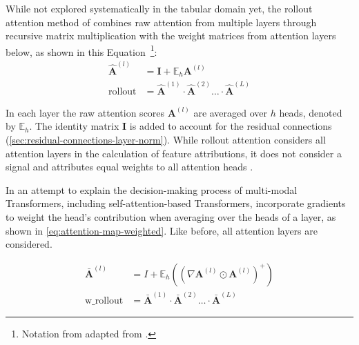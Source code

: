 While not explored systematically in the tabular domain yet, the rollout attention method of \textcite[][3]{abnarQuantifyingAttentionFlow2020} combines raw attention from multiple layers through recursive matrix multiplication with the weight matrices from attention layers below, as shown in this Equation~\footnote{Notation from adapted from \textcite[][786]{cheferTransformerInterpretabilityAttention2021}.}:
\begin{equation}
    \begin{aligned}
        \hat{\boldsymbol{A}}^{(l)} & =\boldsymbol{I}+\mathbb{E}_h \boldsymbol{A}^{(l)}                                                  \\
        \operatorname { rollout }  & =\hat{\boldsymbol{A}}^{(1)} \cdot \hat{\boldsymbol{A}}^{(2)} \ldots\cdot\hat{\boldsymbol{A}}^{(L)}
    \end{aligned}
    \label{eq:attention-map-rollout}
\end{equation}

In each layer the raw attention scores $\boldsymbol{A}^{(l)}$ are averaged over $h$ heads, denoted by $\mathbb{E}_h$. The identity matrix $\boldsymbol{I}$ is added to account for the residual connections (\cref{sec:residual-connections-layer-norm}). While rollout attention considers all attention layers in the calculation of feature attributions, it does not consider a signal and attributes equal weights to all attention heads \autocite[][786]{cheferTransformerInterpretabilityAttention2021}.

In an attempt to explain the decision-making process of multi-modal Transformers, including self-attention-based Transformers, \textcite[][3]{cheferTransformerInterpretabilityAttention2021} incorporate gradients to weight the head's contribution when averaging over the heads of a layer, as shown in \cref{eq:attention-map-weighted}. Like before, all attention layers are considered.

\begin{equation}
    \begin{aligned}
        \bar{\boldsymbol{A}}^{(l)} & =I+ \mathbb{E}_h\left(\left(\nabla \boldsymbol{A}^{(l)} \odot \boldsymbol{A}^{(l)}\right)^{+}\right) \\
        \operatorname {w\_rollout} & =\bar{\boldsymbol{A}}^{(1)} \cdot \bar{\boldsymbol{A}}^{(2)} \ldots \cdot \bar{\boldsymbol{A}}^{(L)}
    \end{aligned}
    \label{eq:attention-map-weighted}
\end{equation}


